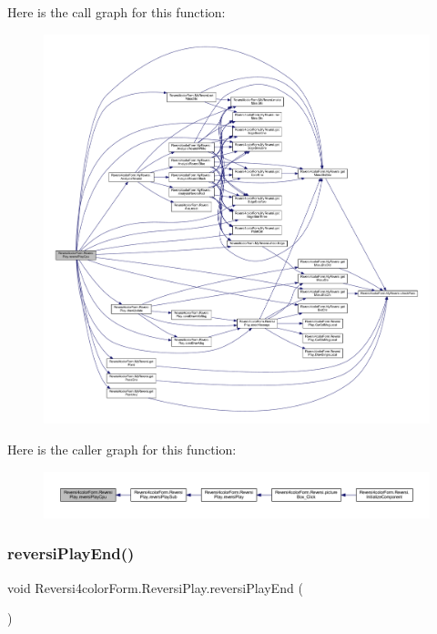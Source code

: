 Here is the call graph for this function\+:\nopagebreak
\begin{figure}[H]
\begin{center}
\leavevmode
\includegraphics[width=350pt]{class_reversi4color_form_1_1_reversi_play_a0fdeec03a631927d44ed2602808b8619_cgraph}
\end{center}
\end{figure}
Here is the caller graph for this function\+:\nopagebreak
\begin{figure}[H]
\begin{center}
\leavevmode
\includegraphics[width=350pt]{class_reversi4color_form_1_1_reversi_play_a0fdeec03a631927d44ed2602808b8619_icgraph}
\end{center}
\end{figure}
\mbox{\label{class_reversi4color_form_1_1_reversi_play_a79053272ed2b985de79154b105c46c15}} 
\subsubsection{\texorpdfstring{reversi\+Play\+End()}{reversiPlayEnd()}}
{\footnotesize\ttfamily void Reversi4color\+Form.\+Reversi\+Play.\+reversi\+Play\+End (\begin{DoxyParamCaption}{ }\end{DoxyParamCaption})}



